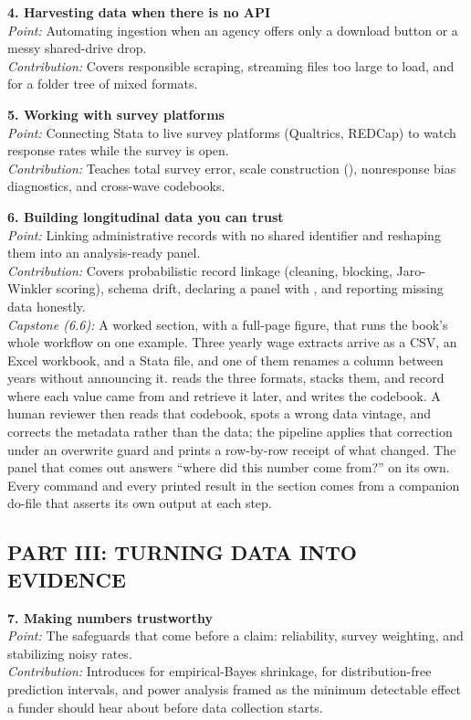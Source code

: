 \documentclass[11pt]{article}
\begin{document}
\textbf{4. Harvesting data when there is no API}\\
\textit{Point:} Automating ingestion when an agency offers only a download button or a messy shared-drive drop.\\
\textit{Contribution:} Covers responsible scraping, streaming files too large to load, and  for a folder tree of mixed formats.

\textbf{5. Working with survey platforms}\\
\textit{Point:} Connecting Stata to live survey platforms (Qualtrics, REDCap) to watch response rates while the survey is open.\\
\textit{Contribution:} Teaches total survey error, scale construction (), nonresponse bias diagnostics, and cross-wave codebooks.

\textbf{6. Building longitudinal data you can trust}\\
\textit{Point:} Linking administrative records with no shared identifier and reshaping them into an analysis-ready panel.\\
\textit{Contribution:} Covers probabilistic record linkage (cleaning, blocking, Jaro-Winkler scoring), schema drift, declaring a panel with , and reporting missing data honestly.\\
\textit{Capstone (6.6):} A worked section, with a full-page figure, that runs the book's whole workflow on one example. Three yearly wage extracts arrive as a CSV, an Excel workbook, and a Stata file, and one of them renames a column between years without announcing it.  reads the three formats,  stacks them,  and  record where each value came from and retrieve it later, and  writes the codebook. A human reviewer then reads that codebook, spots a wrong data vintage, and corrects the metadata rather than the data; the pipeline applies that correction under an overwrite guard and prints a row-by-row receipt of what changed. The panel that comes out answers ``where did this number come from?'' on its own. Every command and every printed result in the section comes from a companion do-file that asserts its own output at each step.

\subsection*{PART III: TURNING DATA INTO EVIDENCE}
\textbf{7. Making numbers trustworthy}\\
\textit{Point:} The safeguards that come before a claim: reliability, survey weighting, and stabilizing noisy rates.\\
\textit{Contribution:} Introduces  for empirical-Bayes shrinkage,  for distribution-free prediction intervals, and power analysis framed as the minimum detectable effect a funder should hear about before data collection starts.
\end{document}
